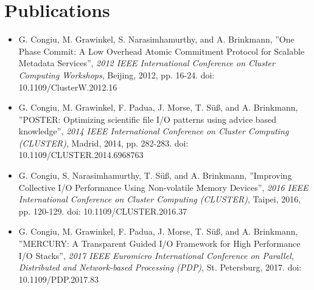 \documentclass[a4paper,titlepage,oneside,11pt]{book}
\begin{document}
\section*{Publications}
\begin{itemize}
    \item G. Congiu, M. Grawinkel, S. Narasimhamurthy, and A. Brinkmann, ''One Phase Commit:
        A Low Overhead Atomic Commitment Protocol for Scalable Metadata Services'', \textit{2012 IEEE
        International Conference on Cluster Computing Workshops}, Beijing, 2012, pp. 16-24.
        doi: 10.1109/ClusterW.2012.16
    \item G. Congiu, M. Grawinkel, F. Padua, J. Morse, T. S\"{u}\ss, and A. Brinkmann, ''POSTER:
        Optimizing scientific file I/O patterns using advice based knowledge'', \textit{2014 IEEE
        International Conference on Cluster Computing (CLUSTER)}, Madrid, 2014, pp. 282-283.
        doi: 10.1109/CLUSTER.2014.6968763
    \item G. Congiu, S. Narasimhamurthy, T. S\"u\ss, and A. Brinkmann, ''Improving Collective
        I/O Performance Using Non-volatile Memory Devices'', \textit{2016 IEEE International Conference on
        Cluster Computing (CLUSTER)}, Taipei, 2016, pp. 120-129.
        doi: 10.1109/CLUSTER.2016.37
    \item G. Congiu, M. Grawinkel, F. Padua, J. Morse, T. S\"u\ss, and A. Brinkmann, ''MERCURY:
        A Transparent Guided I/O Framework for High Performance I/O Stacks'', \textit{2017 IEEE
        Euromicro International Conference on Parallel, Distributed and Network-based Processing (PDP)},
        St. Petersburg, 2017. doi: 10.1109/PDP.2017.83
\end{itemize}
\end{document}
